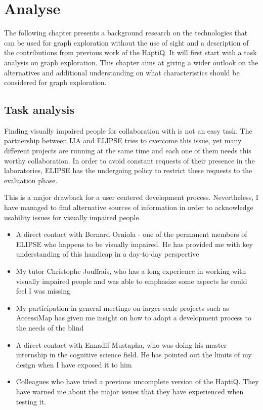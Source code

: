 \chapter{Analyse}

The following chapter presents a background research on the technologies
that can be used for graph exploration without the use of sight and a
description of the contributions from previous work of the HaptiQ. It
will first start with a task analysis on graph exploration. This chapter
aims at giving a wider outlook on the alternatives and additional
understanding on what characteristics should be considered for graph
exploration.

\section{Task analysis}\label{task-analysis}

Finding visually impaired people for collaboration with is not an easy
task. The partnership between IJA and ELIPSE tries to overcome this
issue, yet many different projects are running at the same time and each
one of them needs this worthy collaboration. In order to avoid constant
requests of their presence in the laboratories, ELIPSE has the
undergoing policy to restrict these requests to the evaluation phase.

This is a major drawback for a user centered development process.
Nevertheless, I have managed to find alternative sources of information
in order to acknowledge usability issues for visually impaired people.

\begin{itemize}
\item
  A direct contact with Bernard Orniola - one of the permanent members
  of ELIPSE who happens to be visually impaired. He has provided me with
  key understanding of this handicap in a day-to-day perspective
\item
  My tutor Christophe Jouffrais, who has a long experience in working
  with visually impaired people and was able to emphasize some aspects
  he could feel I was missing
\item
  My participation in general meetings on larger-scale projects such as
  AccessiMap has given me insight on how to adapt a development process
  to the needs of the blind
\item
  A direct contact with Ennadif Mustapha, who was doing his master internship in the
  cognitive science field. He has pointed out the limits of my design
  when I have exposed it to him
\item
  Colleagues who have tried a previous uncomplete version of the HaptiQ.
  They have warned me about the major issues that they have experienced
  when testing it.
\end{itemize}

